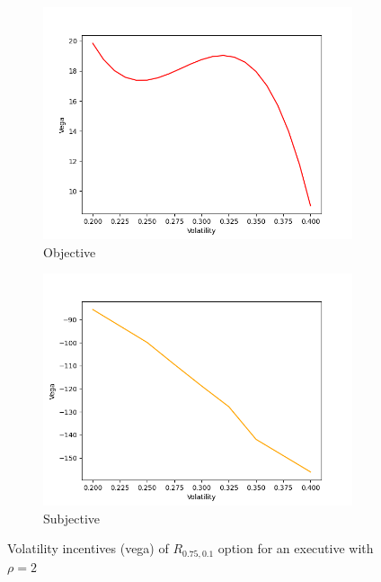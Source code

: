 \vspace*{15pt}
\begin{figure}[H]
    \centering
    \begin{subfigure}{0.45\textwidth}
        \centering
        \includegraphics[width=\textwidth]{fig/4/r_vega_obj.png}
        \caption{Objective}
        \label{fig:r_vega_obj}
    \end{subfigure}
    \hfill
    \begin{subfigure}{0.45\textwidth}
        \centering
        \includegraphics[width=\textwidth]{fig/4/r_vega_subj.png}
        \caption{Subjective}
        \label{fig:r_vega_subj}
    \end{subfigure}
    \caption{Volatility incentives (vega) of $R_{0.75, 0.1}$ option for an executive with $\rho = 2$}
    \label{fig:r_vega_both}
\end{figure}
\vspace*{15pt}